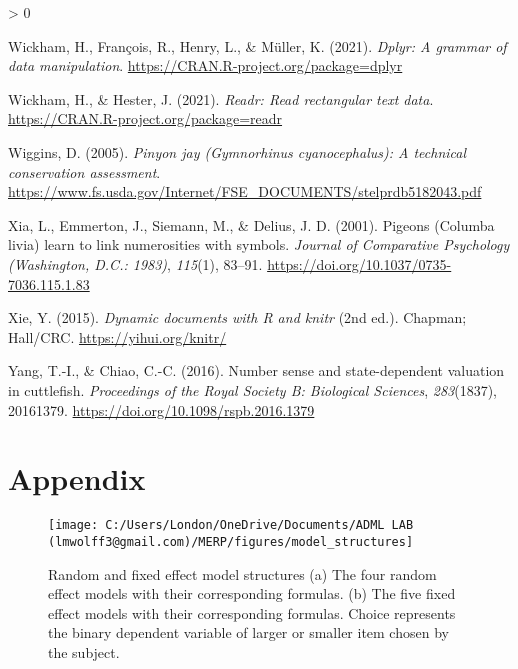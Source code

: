 \documentclass[
  english,
  ,doc,floatsintext]{apa6}
\newlength{\cslhangindent}
\newenvironment{CSLReferences}[2] %
 {%
  \setlength{\parindent}{0pt}
  \ifodd #1 \everypar{\setlength{\hangindent}{\cslhangindent}}\ignorespaces\fi
  \ifnum #2 > 0
  \setlength{\parskip}{#2\baselineskip}
  \fi
 }%
 {}
\begin{document}
\begin{CSLReferences}{1}{0}
\leavevmode\hypertarget{ref-R-dplyr}{}%
Wickham, H., François, R., Henry, L., \& Müller, K. (2021). \emph{Dplyr: A grammar of data manipulation}. \url{https://CRAN.R-project.org/package=dplyr}

\leavevmode\hypertarget{ref-R-readr}{}%
Wickham, H., \& Hester, J. (2021). \emph{Readr: Read rectangular text data}. \url{https://CRAN.R-project.org/package=readr}

\leavevmode\hypertarget{ref-Wiggins.2005}{}%
Wiggins, D. (2005). \emph{Pinyon jay ({Gymnorhinus} cyanocephalus): A technical conservation assessment}. \url{https://www.fs.usda.gov/Internet/FSE_DOCUMENTS/stelprdb5182043.pdf}

\leavevmode\hypertarget{ref-Xia.etal.2001}{}%
Xia, L., Emmerton, J., Siemann, M., \& Delius, J. D. (2001). Pigeons ({Columba} livia) learn to link numerosities with symbols. \emph{Journal of Comparative Psychology (Washington, D.C.: 1983)}, \emph{115}(1), 83--91. \url{https://doi.org/10.1037/0735-7036.115.1.83}

\leavevmode\hypertarget{ref-R-knitr}{}%
Xie, Y. (2015). \emph{Dynamic documents with {R} and knitr} (2nd ed.). Chapman; Hall/CRC. \url{https://yihui.org/knitr/}

\leavevmode\hypertarget{ref-Yang.Chiao.2016}{}%
Yang, T.-I., \& Chiao, C.-C. (2016). Number sense and state-dependent valuation in cuttlefish. \emph{Proceedings of the Royal Society B: Biological Sciences}, \emph{283}(1837), 20161379. \url{https://doi.org/10.1098/rspb.2016.1379}

\end{CSLReferences}

\newpage

\hypertarget{appendix}{%
\section{Appendix}\label{appendix}}

\renewcommand{\thetable}{A\arabic{table}}
\setcounter{table}{0}
\renewcommand{\thefigure}{A\arabic{figure}}
\setcounter{figure}{0}



\begin{figure}

{\centering \texttt{[image: C:/Users/London/OneDrive/Documents/ADML LAB (lmwolff3@gmail.com)/MERP/figures/model\_structures]} 

}

\caption{Random and fixed effect model structures (a) The four random effect models with their corresponding formulas. (b) The five fixed effect models with their corresponding formulas. Choice represents the binary dependent variable of larger or smaller item chosen by the subject.}\label{fig:modeltable}
\end{figure}
\end{document}
